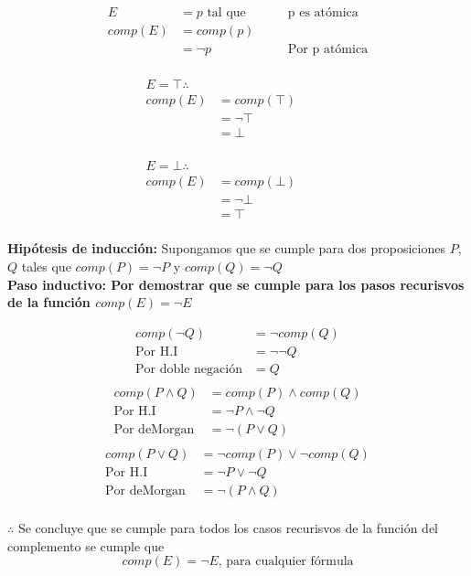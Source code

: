 \begin{multicols}{3}
	\begin{alignat*}{2}
		E       & = p \text{ tal que } & \quad & \text{p es atómica}  \\
		comp(E) & = comp(p)                                           \\
		        & = \neg p             & \quad & \text{Por p atómica} \\
	\end{alignat*}

	\begin{alignat*}{2}
		E=\top\therefore                         \\
		comp(E) & = comp(\top)                   \\
		        & = \neg \top  & \quad & \text{} \\
		        & = \bot       & \quad & \text{} \\
	\end{alignat*}

	\begin{alignat*}{2}
		E=\bot\therefore                         \\
		comp(E) & = comp(\bot)                   \\
		        & =\neg \bot   & \quad & \text{} \\
		        & =\top        & \quad & \text{} \\
	\end{alignat*}
\end{multicols}

\textbf{Hipótesis de inducción:} Supongamos que se cumple para dos proposiciones $P$, $Q$ tales que  $comp(P)=\neg P$ y $comp(Q)=\neg Q$\\
\textbf{Paso inductivo: Por demostrar que se cumple para los pasos recurisvos 
de la función $comp(E)=\neg E$}
\begin{multicols}{3}
	\noindent
	\begin{align*}
		comp(\neg Q)              & = \neg comp(Q) \\
		\text{Por H.I}            & = \neg \neg Q  \\
		\text{Por doble negación} & =  Q           \\
	\end{align*}
\noindent
	\begin{align*}
		comp(P\land Q)      & = comp(P)\land comp(Q) \\
		\text{Por H.I}      & = \neg P \land \neg Q  \\
		\text{Por deMorgan} & = \neg (P\lor Q)       \\
	\end{align*}
\noindent
	\begin{align*}
		comp(P\lor Q)       & = \neg comp(P) \lor \neg comp(Q) \\
		\text{Por H.I}      & = \neg P \lor \neg Q             \\
		\text{Por deMorgan} & = \neg (P\land Q)                \\
	\end{align*}
\end{multicols}

$\therefore$ Se concluye que se cumple para todos los casos recurisvos de la función del complemento se cumple que$$comp(E)=\neg E\text{, para cualquier fórmula}$$